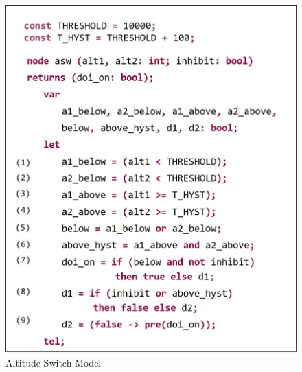 \begin{figure}
\centering
\includegraphics[width=0.7\columnwidth]{figs/code.jpg}
\vspace{-0.1in}
\caption{Altitude Switch Model }
\label{fig:asw}
\end{figure}

